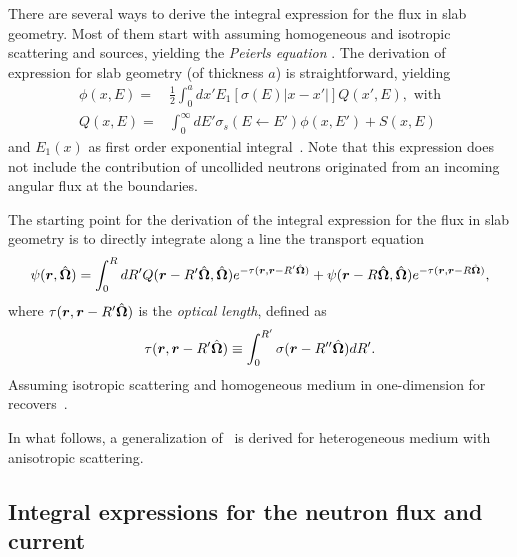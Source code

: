 There are several ways to derive the integral expression for the flux in slab geometry. Most of them start with assuming homogeneous and isotropic scattering and sources, yielding the \emph{Peierls equation} \cite{Davison-1957,Case-1967,Bell-1970,Pomraning-1973,Duderstadt-1979,Lewis-1984}. The derivation of expression for slab geometry (of thickness $a$) is straightforward, yielding
\begin{equation}\label{eq:flux-slab-l-0-no-bndry-terms}
\begin{split}
\phi(x,E)=&\frac{1}{2}\int_0^a { dx'
	E_1\left[\sigma(E)\lvert x-x'\rvert\right] Q(x',E)
}, \text{ with} \\
Q(x,E) =& \int_0^\infty { dE'
		\sigma_s(E \leftarrow E')\phi(x,E') + S(x,E)
}
\end{split}
\end{equation}
and $E_1(x)$ as first order exponential integral~\cite{Abramowitz-1964}. Note that this expression does not include the contribution of uncollided neutrons originated from an incoming angular flux at the boundaries.

The starting point for the derivation of the integral expression for the flux in slab geometry is to directly integrate along a line the transport equation~\cite{Davison-1957,Pomraning-1973,Duderstadt-1979,Lewis-1984}
\begin{equation}\label{eq:full-ITE-w-bndry-terms}
\psi(\bm{r},\hat{\bm{\Omega}}) = \int_0^R { dR'
	Q(\bm{r}-R'\hat{\bm{\Omega}},\hat{\bm{\Omega}}) e^{-\tau(\bm{r},\bm{r}-R'\hat{\bm{\Omega}})}
} + \psi(\bm{r}-R\hat{\bm{\Omega}},\hat{\bm{\Omega}}) e^{-\tau(\bm{r},\bm{r}-R\hat{\bm{\Omega}})},
\end{equation}
where $\tau(\bm{r},\bm{r}-R'\hat{\bm{\Omega}})$ is the \emph{optical length}, defined as
\begin{equation}\label{eq:opl}
\tau(\bm{r},\bm{r}-R'\hat{\bm{\Omega}}) \equiv \int_0^{R'} {\sigma(\bm{r}-R''\hat{\bm{\Omega}})dR'} .
\end{equation}
Assuming isotropic scattering and homogeneous medium in one-dimension for~ recovers~. 

In what follows, a generalization of~ is derived for heterogeneous medium with anisotropic scattering.  
%
\subsection{Integral expressions for the neutron flux and current}
\label{sec:int-flux-J}

